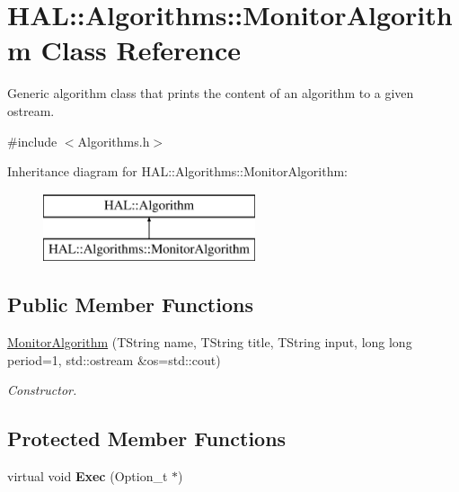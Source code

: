 \hypertarget{class_h_a_l_1_1_algorithms_1_1_monitor_algorithm}{\section{H\+A\+L\+:\+:Algorithms\+:\+:Monitor\+Algorithm Class Reference}
\label{class_h_a_l_1_1_algorithms_1_1_monitor_algorithm}
}


Generic algorithm class that prints the content of an algorithm to a given ostream.  




{\ttfamily \#include $<$Algorithms.\+h$>$}

Inheritance diagram for H\+A\+L\+:\+:Algorithms\+:\+:Monitor\+Algorithm\+:\begin{figure}[H]
\begin{center}
\leavevmode
\includegraphics[height=2.000000cm]{class_h_a_l_1_1_algorithms_1_1_monitor_algorithm}
\end{center}
\end{figure}
\subsection*{Public Member Functions}
\begin{DoxyCompactItemize}
\item 
\hyperlink{class_h_a_l_1_1_algorithms_1_1_monitor_algorithm_ac37ea6c50b23dbb49b63d9fe551554a7}{Monitor\+Algorithm} (T\+String name, T\+String title, T\+String input, long long period=1, std\+::ostream \&os=std\+::cout)
\begin{DoxyCompactList}\small\item\em Constructor. \end{DoxyCompactList}\end{DoxyCompactItemize}
\subsection*{Protected Member Functions}
\begin{DoxyCompactItemize}
\item 
\hypertarget{class_h_a_l_1_1_algorithms_1_1_monitor_algorithm_ae1efc679e7dcbc8692a6b37dca0517c3}{virtual void {\bfseries Exec} (Option\+\_\+t $\ast$)}\label{class_h_a_l_1_1_algorithms_1_1_monitor_algorithm_ae1efc679e7dcbc8692a6b37dca0517c3}

\end{DoxyCompactItemize}
